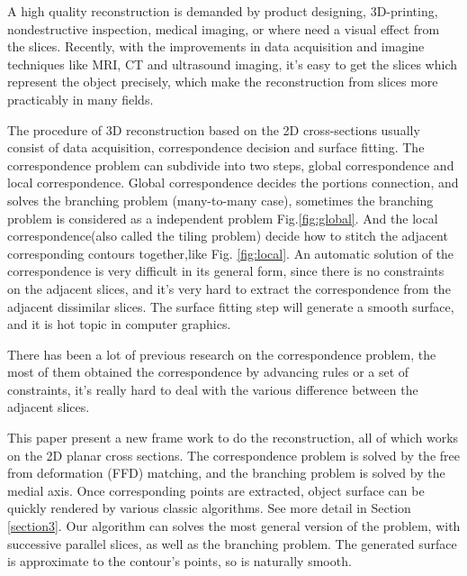 \documentclass[3p,times]{elsarticle}
\begin{document}
A high quality reconstruction is demanded by product designing, 3D-printing,
nondestructive inspection, medical imaging, or where need a visual
effect from the slices. Recently, with the improvements in data
acquisition and imagine techniques like MRI, CT and ultrasound
imaging, it's easy to get the slices which represent the object
precisely, which make the reconstruction from slices more practicably
 in many fields.

The procedure of 3D reconstruction based on the 2D cross-sections
usually consist of data acquisition, correspondence decision and
surface fitting. The correspondence problem can subdivide into two steps,
global correspondence and local correspondence. Global correspondence
decides the portions connection, and solves the branching
problem (many-to-many case), sometimes the branching problem is
considered as a independent problem Fig.\ref{fig:global}. And the local
correspondence(also called the tiling problem) decide how
to stitch the adjacent corresponding contours together,like
Fig. \ref{fig:local}. An automatic solution of the correspondence is
very difficult in its general form, since there is no constraints on
the adjacent slices, and it's very hard to extract the correspondence
from the adjacent dissimilar slices. The surface fitting step will
generate a smooth surface, and it is hot topic in computer
graphics.

There has been a lot of previous research on the correspondence
problem, the most of them obtained the correspondence by advancing
rules or a set of constraints, it's really hard to deal with the
various difference between the adjacent slices.

This paper present a new frame work to do the reconstruction, all of which
works on the 2D planar cross sections. The correspondence problem is
solved by the free from deformation (FFD) matching, and the branching
problem is solved by the medial axis. Once corresponding points are
extracted, object surface can be quickly rendered by various classic algorithms. See more detail in Section \ref{section3}.
Our algorithm can solves the most general version of the problem, with
successive parallel slices, as well as the branching problem. The generated
surface is approximate to the contour's points, so is naturally
smooth.
\end{document}
